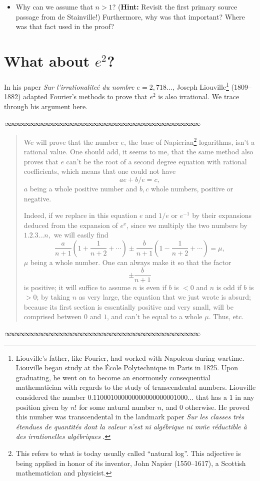 \documentclass[11pt]{article}
\newcommand{\sep}{\vspace{-3pt}
\begin{center}
{\mathversion{normal}
$\infty \mspace{-5.5mu}\infty \mspace{-5.5mu}\infty \mspace{-5.5mu}\infty \mspace{-5.5mu}
\infty \mspace{-5.5mu}\infty \mspace{-5.5mu}\infty \mspace{-5.5mu}\infty \mspace{-5.5mu}
\infty \mspace{-5.5mu}\infty \mspace{-5.5mu}\infty \mspace{-5.5mu}\infty \mspace{-5.5mu}
\infty \mspace{-5.5mu}\infty \mspace{-5.5mu}\infty \mspace{-5.5mu}\infty \mspace{-5.5mu}
\infty \mspace{-5.5mu}\infty \mspace{-5.5mu}\infty \mspace{-5.5mu}\infty \mspace{-5.5mu}
\infty \mspace{-5.5mu}\infty \mspace{-5.5mu}\infty \mspace{-5.5mu}\infty \mspace{-5.5mu}
\infty \mspace{-5.5mu}\infty \mspace{-5.5mu}\infty \mspace{-5.5mu}\infty \mspace{-5.5mu}
\infty \mspace{-5.5mu}\infty \mspace{-5.5mu}\infty \mspace{-5.5mu}\infty \mspace{-5.5mu}
\infty \mspace{-5.5mu}\infty \mspace{-5.5mu}\infty \mspace{-5.5mu}\infty \mspace{-5.5mu}
\infty \mspace{-5.5mu}\infty \mspace{-5.5mu}\infty \mspace{-5.5mu}\infty \mspace{-5.5mu}$}
\end{center} \vspace*{-5pt}}
\newenvironment{source}%
 {\bigskip \sep \vspace*{-6pt} \begin{quote}
          \begin{sf}   }
   {   \end{sf}     \end{quote} \vspace*{-6pt} \sep \bigskip}%
\newcounter{tasknumb}
\newcommand{\tasknumb}[1]{\refstepcounter{tasknumb}\textmd{\textbf{$\fbox{$\fbox{Task \thetasknumb}$}$}}#1}
\newenvironment{task}[1][]%
 {\begin{itemize}
 \item[\tasknumb{#1}]  }
{
    \end{itemize}    }%
\begin{document}
\begin{task}
Why can we assume that $n>1$?  ({\bf Hint:} Revisit the first primary source passage from de Stainville!)  Furthermore, why was that important?  Where was that fact used in the proof?
\end{task}


\section{What about $e^2$?}\label{eSquared}

In his paper \emph{Sur l'irrationalite\'{e} du nombre $e=2,718\ldots$}, Joseph Liouville\footnote{Liouville's father, like Fourier, had worked with Napoleon during wartime. Liouville began study at the \'{E}cole Polytechnique in Paris in 1825. Upon graduating, he went on to become an enormously consequential mathematician with regards to the study of transcendental numbers.  Liouville considered the number $0.110001000000000000000001000\ldots$ that has a $1$ in any position given by $n!$ for some natural number $n$, and $0$ otherwise. He proved this number was transcendental in the landmark paper \emph{Sur les classes tr\`es \'etendues de quantit\'es dont la valeur n'est ni alg\'ebrique ni m\^me r\'eductible \`a des irrationelles alg\'ebriques} \citep{transcendental}.} (1809--1882) adapted Fourier's methods to prove that $e^2$ is also irrational.  We trace through his argument here.

\begin{source}

We will prove that the number $e$, the base of Napierian\footnote{This refers to what is today usually called ``natural log''.  This adjective is being applied in honor of its inventor, John Napier (1550--1617), a Scottish mathematician and physicist.} logarithms, isn't a rational value.  One should add, it seems to me, that the same method also proves that $e$ can't be the root of a second degree equation with rational coefficients, which means that one could not have $$ae+b/e=c,$$ $a$ being a whole positive number and $b,c$ whole numbers, positive or negative. 

Indeed, if we replace in this equation $e$ and $1/e$ or $e^{-1}$ by their expansions deduced from the expansion of $e^x$, since we multiply the two numbers by $1.2.3\ldots n,$ we will easily find $$\frac{a}{n+1}\left(1+\frac{1}{n+2}+\cdots \right)\pm \frac{b}{n+1}\left(1-\frac{1}{n+2}+\cdots \right)=\mu,  $$ $\mu$ being a whole number.  One can always make it so that the factor $$\pm \frac{b}{n+1}$$ is positive; it will suffice to assume $n$ is even if $b$ is $<0$ and $n$ is odd if $b$ is $>0$; by taking $n$ as very large, the equation that we just wrote is absurd; because its first section is essentially positive and very small, will be comprised between $0$ and $1$, and can't be equal to a whole $\mu$.  Thus, etc.

\end{source}
\end{document}
